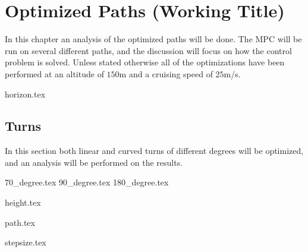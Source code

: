 \chapter{Optimized Paths (Working Title)}


In this chapter an analysis of the optimized paths will be done. The MPC will be run on several different paths, and the discussion will focus on how the control problem is solved. Unless stated otherwise all of the optimizations have been performed at an altitude of $150$m and a cruising speed of $25$m/s.

{horizon.tex}

\section{Turns}

In this section both linear and curved turns of different degrees will be optimized, and an analysis will be performed on the results.

{70_degree.tex}
{90_degree.tex}
{180_degree.tex}	

{height.tex}

{path.tex}

{stepsize.tex}